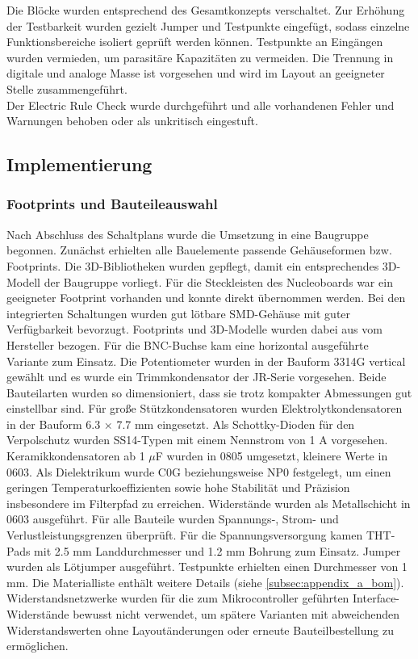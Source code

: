 \documentclass[a4paper, portrait, 12pt]{scrartcl} %
\begin{document}
Die Blöcke wurden entsprechend des Gesamtkonzepts verschaltet. Zur Erhöhung der Testbarkeit wurden gezielt Jumper und Testpunkte eingefügt, sodass einzelne Funktionsbereiche isoliert geprüft werden können. Testpunkte an Eingängen wurden vermieden, um parasitäre Kapazitäten zu vermeiden. Die Trennung in digitale und analoge Masse ist vorgesehen und wird im Layout an geeigneter Stelle zusammengeführt.\\

Der Electric Rule Check wurde durchgeführt und alle vorhandenen Fehler und Warnungen behoben oder als unkritisch eingestuft.


\subsection{Implementierung}
\label{subsec:hw_implementation}

\subsubsection{Footprints und Bauteileauswahl}

Nach Abschluss des Schaltplans wurde die Umsetzung in eine Baugruppe begonnen. Zunächst erhielten alle Bauelemente passende Gehäuseformen bzw. Footprints. Die 3D-Bibliotheken wurden gepflegt, damit ein entsprechendes 3D-Modell der Baugruppe vorliegt. Für die Steckleisten des Nucleoboards war ein geeigneter Footprint vorhanden und konnte direkt übernommen werden. Bei den integrierten Schaltungen wurden gut lötbare SMD-Gehäuse mit guter Verfügbarkeit bevorzugt. Footprints und 3D-Modelle wurden dabei aus vom Hersteller bezogen. Für die BNC-Buchse kam eine horizontal ausgeführte Variante zum Einsatz. Die Potentiometer wurden in der Bauform 3314G vertical gewählt und es wurde ein Trimmkondensator der JR-Serie vorgesehen. Beide Bauteilarten wurden so dimensioniert, dass sie trotz kompakter Abmessungen gut einstellbar sind. Für große Stützkondensatoren wurden Elektrolytkondensatoren in der Bauform 6.3 × 7.7 mm eingesetzt. Als Schottky-Dioden für den Verpolschutz wurden SS14-Typen mit einem Nennstrom von 1 A vorgesehen. Keramikkondensatoren ab 1 $\mu$F wurden in 0805 umgesetzt, kleinere Werte in 0603. Als Dielektrikum wurde C0G beziehungsweise NP0 festgelegt, um einen geringen Temperaturkoeffizienten sowie hohe Stabilität und Präzision insbesondere im Filterpfad zu erreichen. Widerstände wurden als Metallschicht in 0603 ausgeführt. Für alle Bauteile wurden Spannungs-, Strom- und Verlustleistungsgrenzen überprüft. Für die Spannungsversorgung kamen THT-Pads mit 2.5 mm Landdurchmesser und 1.2 mm Bohrung zum Einsatz. Jumper wurden als Lötjumper ausgeführt. Testpunkte erhielten einen Durchmesser von 1 mm. Die Materialliste enthält weitere Details (siehe \autoref{subsec:appendix_a_bom}). Widerstandsnetzwerke wurden für die zum Mikrocontroller geführten Interface-Widerstände bewusst nicht verwendet, um spätere Varianten mit abweichenden Widerstandswerten ohne Layoutänderungen oder erneute Bauteilbestellung zu ermöglichen.
\end{document}
